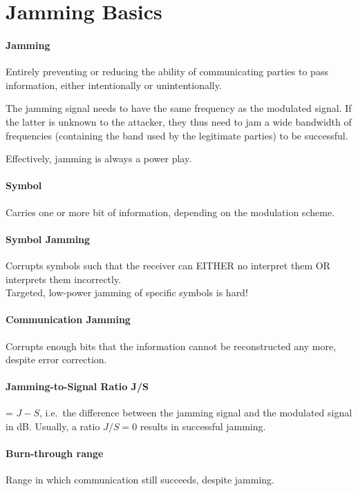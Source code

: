 \section{Jamming Basics}

\paragraph{Jamming}
Entirely preventing or reducing the ability of communicating parties to pass information, either intentionally or unintentionally.

The jamming signal needs to have the same frequency as the modulated signal.
If the latter is unknown to the attacker, they thus need to jam a wide bandwidth of frequencies (containing the band used by the legitimate parties) to be successful.

Effectively, jamming is always a power play.

\paragraph{Symbol}
Carries one or more bit of information, depending on the modulation scheme.

\paragraph{Symbol Jamming}
Corrupts symbols such that the receiver can EITHER no interpret them OR interprets them incorrectly.\\
Targeted, low-power jamming of specific symbols is hard!

\paragraph{Communication Jamming}
Corrupts enough bits that the information cannot be reconstructed any more, despite error correction.

\paragraph{Jamming-to-Signal Ratio J/S} = $J -  S$, i.e.\ the difference between the jamming signal and the modulated signal in dB.
Usually, a ratio $J/S = 0$ results in successful jamming.

\paragraph{Burn-through range}
Range in which communication still succeeds, despite jamming.

